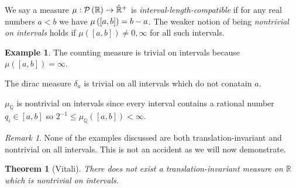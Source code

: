 \documentclass{article}
\newcommand{\Q}{\mathbb{Q}}
\newcommand{\R}{\mathbb{R}}
\newenvironment{definition}[1][Definition:]{\begin{trivlist}
\item[\hskip \labelsep {\bfseries #1}]}{\end{trivlist}}
\theoremstyle{theorem}
\newtheorem{theorem}{Theorem}[section]
\theoremstyle{definition}
\theoremstyle{definition}
\theoremstyle{remark}
\theoremstyle{definition}
\newtheorem{example}{Example}[section]
\theoremstyle{remark}
\newtheorem{remark}{Remark}[subsection]
\begin{document}
\begin{definition}
We say a measure $\mu : \Power{\R} \to \Rcomp$ is \textit{interval-length-compatible} if for any real numbers $a < b$ we have $\mu\left( [a,b] \right) = b - a$. The weaker notion of being \textit{nontrivial on intervals} holds if $\mu([a,b]) \neq 0, \infty$ for all such intervals.
\end{definition}

\begin{example}
\item The counting measure is trivial on intervals because $\mu([a,b]) = \infty$. 

\item The dirac measure $\delta_a$ is trivial on all intervals which do not conatain $a$. 

\item $\mu_{\Q}$ is nontrivial on intervals since every interval contains a rational number $q_i \in [a,b]$ so $2^{-1} \le \mu_{\Q}([a,b]) < \infty$.  
\end{example}

\begin{remark}
None of the examples discussed are both translation-invariant and nontrivial on all intervals. This is not an accident as we will now demonstrate. 
\end{remark}

\begin{theorem}[Vitali]
There does not exist a translation-invariant measure on $\R$ which is nontrivial on intervals.
\end{theorem}
\end{document}

